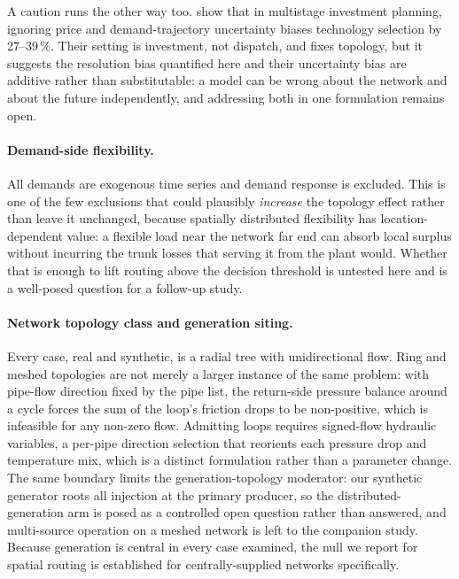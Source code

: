 A caution runs the other way too. \citet{Koek2026} show that in multistage investment
planning, ignoring price and demand-trajectory uncertainty biases technology selection by
27--39\,\%. Their setting is investment, not dispatch, and fixes topology, but it suggests
the resolution bias quantified here and their uncertainty bias are additive rather than
substitutable: a model can be wrong about the network and about the future independently,
and addressing both in one formulation remains open.

\paragraph{Demand-side flexibility.}
All demands are exogenous time series and demand response is excluded. This is one of the
few exclusions that could plausibly \emph{increase} the topology effect rather than leave
it unchanged, because spatially distributed flexibility has location-dependent value: a
flexible load near the network far end can absorb local surplus without incurring the
trunk losses that serving it from the plant would. Whether that is enough to lift routing
above the decision threshold is untested here and is a well-posed question for a follow-up
study.

\paragraph{Network topology class and generation siting.}
Every case, real and synthetic, is a radial tree with unidirectional flow. Ring and meshed
topologies are not merely a larger instance of the same problem: with pipe-flow direction
fixed by the pipe list, the return-side pressure balance around a cycle forces the sum of
the loop's friction drops to be non-positive, which is infeasible for any non-zero flow.
Admitting loops requires signed-flow hydraulic variables, a per-pipe direction selection
that reorients each pressure drop and temperature mix, which is a distinct formulation
rather than a parameter change. The same boundary limits the generation-topology
moderator: our synthetic generator roots all injection at the primary producer, so the
distributed-generation arm is posed as a controlled open question rather than answered,
and multi-source operation on a meshed network is left to the companion study. Because
generation is central in every case examined, the null we report for spatial routing is
established for centrally-supplied networks specifically.

